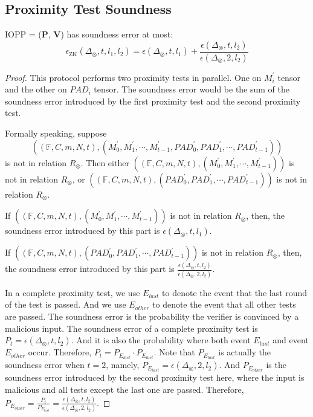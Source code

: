 \subsection{Proximity Test Soundness}

\begin{lemma}
\label{lemma:szkpctc-soundness}


IOPP = ($\textbf{P}$, $\textbf{V}$) has soundness error at most:
$$
    \epsilon_{\text{ZK}}(\Delta_\otimes, t, l_1, l_2) = \epsilon(\Delta_\otimes, t, l_1) + \frac{\epsilon(\Delta_\otimes, t, l_2)}{\epsilon(\Delta_\otimes, 2, l_2)}
$$

\end{lemma}
\begin{proof}


This protocol performs two proximity tests in parallel. One on $M_i^\prime$ tensor and the other on $PAD_i$ tensor. The soundness error would be the sum of the soundness error introduced by the first proximity test and the second proximity test.


Formally speaking, suppose 
$$
    ((\mathbb{F}, C, m, N, t), (M_0^{\prime}, M_1^{\prime}, \cdots, M_{t-1}^{\prime}, PAD_0^{\prime}, PAD_1^{\prime}, \cdots, PAD_{t-1}^{\prime}))
$$ 
is not in relation $R_\otimes$. Then either $((\mathbb{F}, C, m, N, t), (M_0^{\prime}, M_1^{\prime}, \cdots, M_{t-1}^{\prime}))$ is not in relation $R_\otimes$, 
or $((\mathbb{F}, C, m, N, t), (PAD_0^{\prime}, PAD_1^{\prime}, \cdots, PAD_{t-1}^{\prime}))$ is not in relation $R_\otimes$.

If $((\mathbb{F}, C, m, N, t), (M_0^{\prime}, M_1^{\prime}, \cdots, M_{t-1}^{\prime}))$ is not in relation $R_\otimes$, then, the soundness error introduced by this part is $\epsilon(\Delta_\otimes, t, l_1)$. 

If $((\mathbb{F}, C, m, N, t), (PAD_0^{\prime}, PAD_1^{\prime}, \cdots, PAD_{t-1}^{\prime}))$ is not in relation $R_\otimes$, then, the soundness error introduced by this part is $\frac{\epsilon(\Delta_\otimes, t, l_2)}{\epsilon(\Delta_\otimes, 2, l_2)}$.

In a complete proximity test, we use $E_{last}$ to denote the event that the last round of the test is passed. And we use $E_{other}$ to denote the event that all other tests are passed.
The soundness error is the probability the verifier is convinced by a malicious input.
The soundness error of a complete proximity test is $P_t = \epsilon(\Delta_\otimes, t, l_2)$. And it is also the probability where both event $E_{last}$ and event $E_{other}$ occur. Therefore, $P_t = P_{E_{last}} \cdot P_{E_{last}}$. Note that $P_{E_{last}}$ is actually the soundness error when $t=2$, namely, $P_{E_{last}} = \epsilon(\Delta_\otimes, 2, l_2)$. And $P_{E_{other}}$ is the soundness error introduced by the second proximity test here, where the input is malicious and all tests except the last one are passed. Therefore, $P_{E_{other}} = \frac{P_{t}}{P_{E_{last}}} = \frac{\epsilon(\Delta_\otimes, t, l_2)}{\epsilon(\Delta_\otimes, 2, l_2)}$.

\end{proof}


